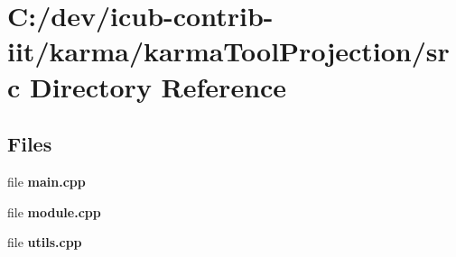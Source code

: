 \section{C\+:/dev/icub-\/contrib-\/iit/karma/karma\+Tool\+Projection/src Directory Reference}
\label{dir_f9805a429fa21d3d8fbea8a1c16643a5}
\subsection*{Files}
\begin{DoxyCompactItemize}
\item 
file {\bfseries main.\+cpp}
\item 
file {\bfseries module.\+cpp}
\item 
file {\bfseries utils.\+cpp}
\end{DoxyCompactItemize}
